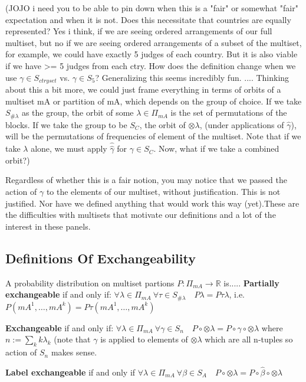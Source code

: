 \documentclass{article}
\theoremstyle{definition}
\begin{document}
(JOJO i need you to be able to pin down when this is a "fair" or somewhat "fair" expectation and when it is not. Does this necessitate that countries are equally represented? Yes i think, if we are seeing ordered arrangements of our full multiset, but no if we are seeing ordered arrangements of a subset of the multiset, for example, we could have exactly 5 judges of each country. But it is also viable if we have >= 5 judges from each ctry. How does the definition change when we use $\gamma\in S_{ctry set}$ vs. $\gamma\in S_5$? Generalizing this seems incredibly fun.   .... Thinking about this a bit more, we could just frame everything in terms of orbits of a multiset mA or partition of mA, which depends on the group of choice. If we take $S_{\#\lambda}$ as the group, the orbit of some $\lambda \in \Pi_{mA}$ is the set of permutations of the blocks. If we take the group to be $S_C$, the orbit of $\otimes\lambda$, (under applications of $\hat{\gamma}$), will be the permutations of frequencies of element of the multiset. Note that if we take $\lambda$ alone, we must apply $\hat{\hat{\gamma}}$ for $\gamma \in S_C$. Now, what if we take a combined orbit?)

Regardless of whether this is a fair notion, you may notice that we passed the action of $\gamma $ to the elements of our multiset, without justification. This is not justified. Nor have we defined anything that would work this way (yet).These are the difficulties with multisets that motivate our definitions and a lot of the interest in these panels.

\subsection{Definitions Of Exchangeability}
A probability distribution on multiset partions $P: \Pi_{mA}\rightarrow \mathbb{R}$ is.....
\textbf{Partially exchangeable} if and only if: 	$\forall \lambda \in \Pi_{mA}\:  \forall\tau\in S_{\#\lambda} \quad P\lambda =P\tau\lambda$, i.e. $P(mA^1,…,mA^k)= P\tau(mA^1,…,mA^k) $

\textbf{Exchangeable} if and only if:
$\forall \lambda \in \Pi_{mA}\:\forall \gamma\in S_n\quad P\circ\otimes\lambda=P\circ\gamma\circ\otimes\lambda $ where $n:=\sum_k k\lambda_k$ (note that $\gamma$ is applied to elements of $\otimes\lambda$ which are all n-tuples so action of $S_n$ makes sense.

\textbf{Label exchangeable} if and only if $\forall \lambda \in \Pi_{mA} \: \forall \beta \in S_A \quad P\circ\otimes\lambda = P\circ\hat{\beta}\circ\otimes\lambda$ 
\end{document}
